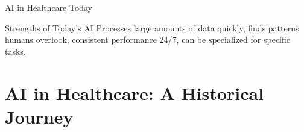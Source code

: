 \documentclass[aspectratio=169, 10pt]{beamer}
\begin{document}
\begin{frame}{AI in Healthcare Today}
    \vspace{3mm}
    \begin{block}{\footnotesize Strengths of Today's AI}
        \footnotesize
        Processes large amounts of data quickly, finds patterns humans overlook, consistent performance 24/7, can be specialized for specific tasks.
    \end{block}

\end{frame}

\section{AI in Healthcare: A Historical Journey}
\end{document}
